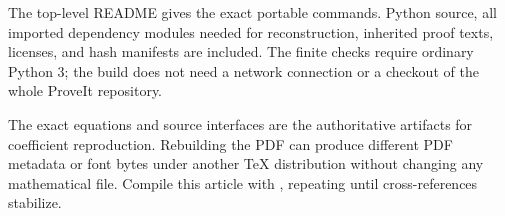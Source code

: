 The top-level README gives the exact portable commands. Python source, all imported dependency modules needed for reconstruction, inherited proof texts, licenses, and hash manifests are included. The finite checks require ordinary Python 3; the build does not need a network connection or a checkout of the whole ProveIt repository.

The exact equations and source interfaces are the authoritative artifacts for coefficient reproduction. Rebuilding the PDF can produce different PDF metadata or font bytes under another TeX distribution without changing any mathematical file. Compile this article with , repeating until cross-references stabilize.
